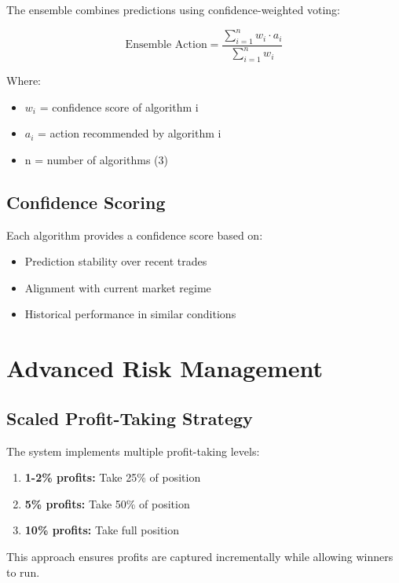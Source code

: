 \documentclass[11pt,a4paper]{article}
\begin{document}
The ensemble combines predictions using confidence-weighted voting:

\begin{equation}
\text{Ensemble Action} = \frac{\sum_{i=1}^{n} w_i \cdot a_i}{\sum_{i=1}^{n} w_i}
\end{equation}

Where:
\begin{itemize}
    \item $w_i$ = confidence score of algorithm i
    \item $a_i$ = action recommended by algorithm i
    \item n = number of algorithms (3)
\end{itemize}

\subsection{Confidence Scoring}

Each algorithm provides a confidence score based on:
\begin{itemize}
    \item Prediction stability over recent trades
    \item Alignment with current market regime
    \item Historical performance in similar conditions
\end{itemize}

\section{Advanced Risk Management}

\subsection{Scaled Profit-Taking Strategy}

The system implements multiple profit-taking levels:

\begin{enumerate}
    \item \textbf{1-2\% profits:} Take 25\% of position
    \item \textbf{5\% profits:} Take 50\% of position
    \item \textbf{10\% profits:} Take full position
\end{enumerate}

This approach ensures profits are captured incrementally while allowing winners to run.
\end{document}
